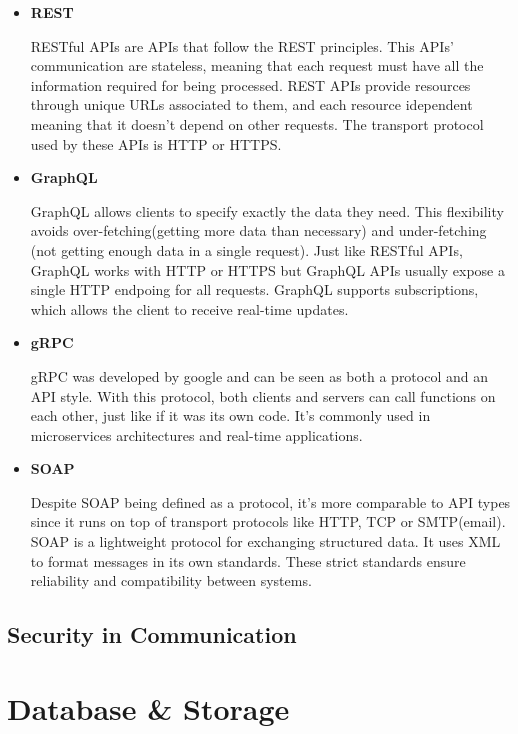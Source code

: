 \begin{itemize}
	\item \textbf{REST}

	      RESTful APIs are APIs that follow the REST principles. This APIs'
	      communication are stateless, meaning that each request must have all
	      the information required for being processed.
	      REST APIs provide resources through unique URLs associated to them, and
	      each resource idependent meaning that it doesn't depend on other
	      requests. The transport protocol used by these APIs is HTTP or HTTPS.

	\item \textbf{GraphQL}

	      GraphQL allows clients to specify exactly the data they need. This
	      flexibility avoids over-fetching(getting more data than necessary) and
	      under-fetching (not getting enough data in a single request).
	      Just like RESTful APIs, GraphQL works with HTTP or HTTPS but GraphQL APIs
	      usually expose a single HTTP endpoing for all requests.
	      GraphQL supports subscriptions, which allows the client to receive
	      real-time updates.

	\item \textbf{gRPC}

	      gRPC was developed by google and can be seen as both a protocol and an
	      API style. With this protocol, both clients and servers can call
	      functions on each other, just like if it was its own code.
	      It's commonly used in microservices architectures and real-time applications.

	\item \textbf{SOAP}

	      Despite SOAP being defined as a protocol, it's more comparable to API
	      types since it runs on top of transport protocols like HTTP, TCP or
	      SMTP(email).
	      SOAP is a lightweight protocol for exchanging structured data. It uses XML
	      to format messages in its own standards. These strict standards ensure
	      reliability and compatibility between systems.

\end{itemize}
\subsection{Security in Communication}


\section{Database \& Storage}
